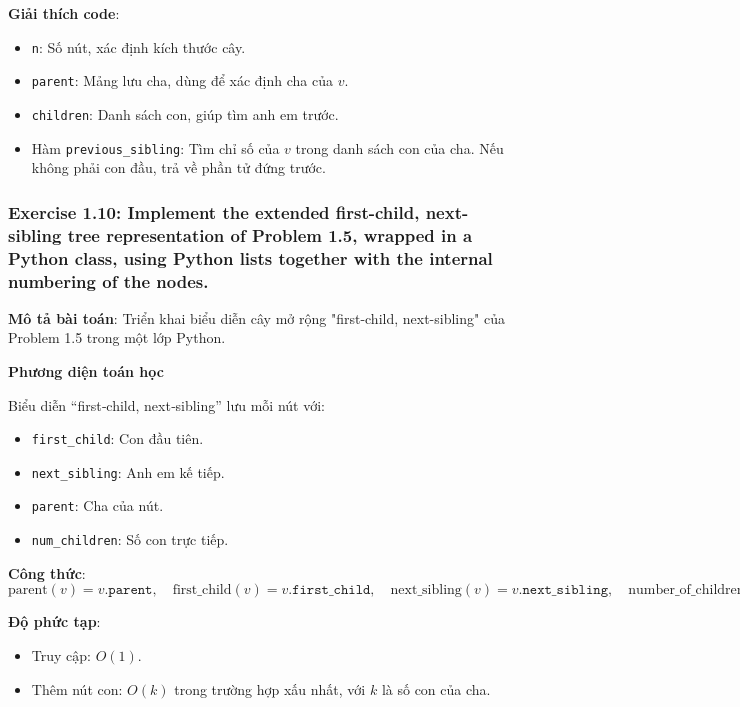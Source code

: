 \documentclass[a4paper,12pt]{article}
\begin{document}
\textbf{Giải thích code}:
\begin{itemize}
    \item \texttt{n}: Số nút, xác định kích thước cây.
    \item \texttt{parent}: Mảng lưu cha, dùng để xác định cha của \( v \).
    \item \texttt{children}: Danh sách con, giúp tìm anh em trước.
    \item Hàm \texttt{previous\_sibling}: Tìm chỉ số của \( v \) trong danh sách con của cha. Nếu không phải con đầu, trả về phần tử đứng trước.
\end{itemize}

\subsubsection{Exercise 1.10: Implement the extended first-child, next-sibling tree representation of Problem 1.5, wrapped in a Python class, using Python lists together with the internal numbering of the nodes.}
\textbf{Mô tả bài toán}: Triển khai biểu diễn cây mở rộng "first-child, next-sibling" của Problem 1.5 trong một lớp Python.

\textbf{Phương diện toán học}

Biểu diễn “first‑child, next‑sibling” lưu mỗi nút với:
\begin{itemize}
    \item \texttt{first\_child}: Con đầu tiên.
    \item \texttt{next\_sibling}: Anh em kế tiếp.
    \item \texttt{parent}: Cha của nút.
    \item \texttt{num\_children}: Số con trực tiếp.
\end{itemize}

\textbf{Công thức}:
\[
\text{parent}(v) = v.\texttt{parent}, 
\quad 
\text{first\_child}(v) = v.\texttt{first\_child}, 
\quad 
\text{next\_sibling}(v) = v.\texttt{next\_sibling}, 
\quad 
\text{number\_of\_children}(v) = v.\texttt{num\_children}.
\]

\textbf{Độ phức tạp}:
\begin{itemize}
    \item Truy cập: \( O(1) \).
    \item Thêm nút con: \( O(k) \) trong trường hợp xấu nhất, với \( k \) là số con của cha.
\end{itemize}
\end{document}
